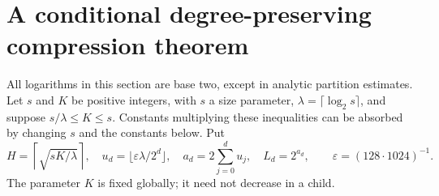 \section{A conditional degree-preserving compression theorem}
\label{sec:conditional-degree-kernel}
All logarithms in this section are base two, except in analytic partition estimates.
Let $s$ and $K$ be positive integers, with $s$ a size parameter, $\lambda=\lceil\log_2 s\rceil$, and suppose
$s/\lambda\le K\le s$. Constants multiplying these inequalities can be absorbed
by changing $s$ and the constants below. Put
\[
 H=\left\lceil\sqrt{sK/\lambda}\right\rceil,
 \quad u_d=\lfloor\varepsilon\lambda/2^d\rfloor,
 \quad a_d=2\sum_{j=0}^d u_j,
 \quad L_d=2^{a_d},\qquad \varepsilon=(128\cdot1024)^{-1}.
\]
The parameter $K$ is fixed globally; it need not decrease in a child.


